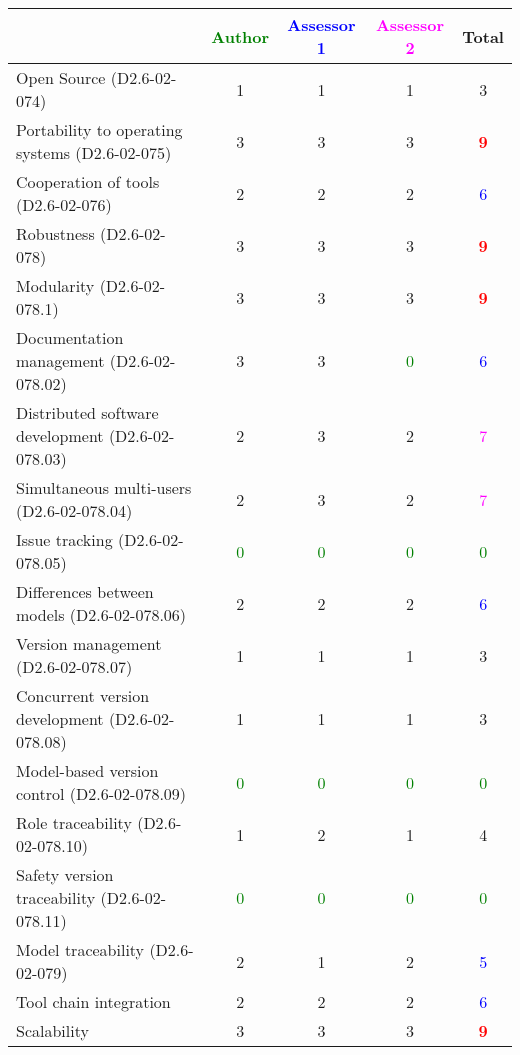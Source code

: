 \begin{tabular}{|l | c | c | c | c|}
\hline
& \textcolor{green}{Author} & \textcolor{blue}{Assessor 1} & \textcolor{magenta}{Assessor 2} & Total \\
\hline 
Open Source (D2.6-02-074) & 1     & 1     & 1     & 3     \\
\hline 
Portability to operating systems (D2.6-02-075) & 3     & 3     & 3     & \textcolor{red}{\textbf{9}} \\
\hline
Cooperation of tools (D2.6-02-076) & 2     & 2     & 2     & \textcolor{blue}{6} \\
\hline
Robustness (D2.6-02-078) & 3     & 3     & 3     & \textcolor{red}{\textbf{9}} \\
\hline
Modularity (D2.6-02-078.1) & 3     & 3     & 3     & \textcolor{red}{\textbf{9}} \\
\hline
Documentation management (D2.6-02-078.02) & 3     & 3     & \textcolor{green}{0} & \textcolor{blue}{6} \\
\hline
Distributed software development (D2.6-02-078.03)  & 2     & 3     & 2     & \textcolor{magenta}{7} \\
\hline
Simultaneous multi-users (D2.6-02-078.04)   & 2     & 3     & 2     & \textcolor{magenta}{7} \\
\hline
Issue tracking (D2.6-02-078.05) & \textcolor{green}{0} & \textcolor{green}{0} & \textcolor{green}{0} & \textcolor{green}{0} \\
\hline
Differences between models (D2.6-02-078.06) & 2     & 2     & 2     & \textcolor{blue}{6} \\
\hline
Version management (D2.6-02-078.07) & 1     & 1     & 1     & 3     \\
\hline
Concurrent version development (D2.6-02-078.08) & 1     & 1     & 1     & 3     \\
\hline
Model-based version control (D2.6-02-078.09) & \textcolor{green}{0} & \textcolor{green}{0} & \textcolor{green}{0} & \textcolor{green}{0} \\
\hline
Role traceability (D2.6-02-078.10) & 1     & 2     & 1     & 4     \\
\hline
Safety version traceability (D2.6-02-078.11) & \textcolor{green}{0} & \textcolor{green}{0} & \textcolor{green}{0} & \textcolor{green}{0} \\
\hline
Model traceability (D2.6-02-079) & 2     & 1     & 2     & \textcolor{blue}{5} \\
\hline
Tool chain integration & 2     & 2     & 2     & \textcolor{blue}{6} \\
\hline
Scalability & 3     & 3     & 3    & \textcolor{red}{\textbf{9}} \\
\hline
\end{tabular}

